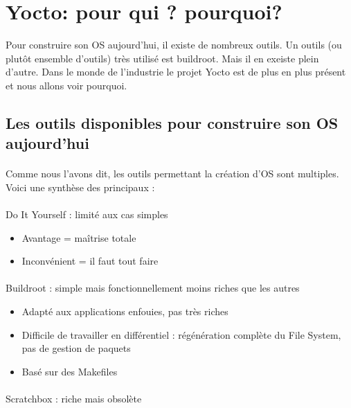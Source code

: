 \section{Yocto: pour qui ? pourquoi?}

Pour construire son OS aujourd'hui, il existe de nombreux outils. Un outils (ou plutôt ensemble d'outils) très utilisé est buildroot. Mais il en exeiste plein d'autre.
Dans le monde de l'industrie le projet Yocto est de plus en plus présent et nous allons voir pourquoi.
\subsection{Les outils disponibles pour construire son OS aujourd'hui}
\paragraph{}

Comme nous l'avons dit, les outils permettant la création d'OS sont multiples.
Voici une synthèse des principaux :
\paragraph{}
Do It Yourself : limité aux cas simples
\begin{itemize} 

\item Avantage = maîtrise totale

\item Inconvénient = il faut tout faire
\end{itemize} 

\paragraph{}
Buildroot : simple mais fonctionnellement moins
riches que les autres
\begin{itemize} 

\item Adapté aux applications enfouies, pas très riches

\item Difficile de travailler en différentiel : régénération complète du
File System, pas de gestion de paquets

\item Basé sur des Makefiles
\end{itemize} 

\paragraph{}
Scratchbox : riche mais obsolète

